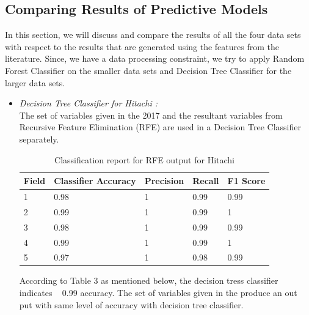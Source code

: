 \documentclass[conference]{IEEEtran}
\begin{document}
\subsection{Comparing Results of Predictive Models}
In this section, we will discuss and compare the results of all the four data sets with respect to the results that are generated using the features from the literature. Since, we have a data processing constraint, we try to apply Random Forest Classifier on the smaller data sets and Decision Tree Classifier for the larger data sets. 

\begin{itemize}
    
    \item \textit{Decision Tree Classifier for Hitachi :}\\
    The set of variables given in the \cite{b13} 2017 and the resultant variables from Recursive Feature Elimination (RFE) are used in a Decision Tree Classifier separately.\\
    
    \begin{table}[]
    \begin{center}
    \caption{Classification report for RFE output for Hitachi}
    \begin{tabular}{||l|l|l|l|l||}
    \hline
    Field & Classifier Accuracy & Precision & Recall & F1 Score \\ \hline
    1     & 0.98                & 1         & 0.99   & 0.99     \\ \hline
    2     & 0.99                & 1         & 0.99   & 1        \\ \hline
    3     & 0.98                & 1         & 0.99   & 0.99     \\ \hline
    4     & 0.99                & 1         & 0.99   & 1        \\ \hline
    5     & 0.97                & 1         & 0.98   & 0.99     \\ \hline
    \end{tabular}
    \end{center}
    \end{table}
    
    According to Table 3 as mentioned below, the decision tress classifier indicates ~ 0.99 accuracy. The set of variables given in the \cite{b13} produce an out put with same level of accuracy with decision tree classifier. 
    

\end{itemize}
\end{document}

